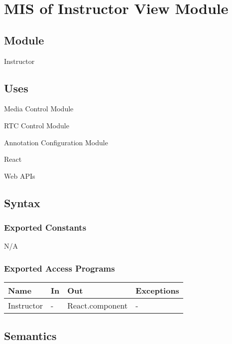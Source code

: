 \documentclass[12pt, titlepage]{article}
\begin{document}
\section{MIS of Instructor View Module} \label{sec:instrcview}

\subsection{Module}

Instructor

\subsection{Uses}

\noindent Media Control Module

\noindent RTC Control Module

\noindent Annotation Configuration Module

\noindent React

\noindent Web APIs

\subsection{Syntax}

\subsubsection{Exported Constants}

N/A

\subsubsection{Exported Access Programs}

\begin{center}
  \begin{tabular}{p{4cm} p{4cm} p{4cm} p{2cm}}
    \hline
    \textbf{Name}    & \textbf{In} & \textbf{Out}          & \textbf{Exceptions} \\
    \hline
    Instructor & -     & React.component & -             \\
    \hline
  \end{tabular}
\end{center}

\subsection{Semantics}
\end{document}

